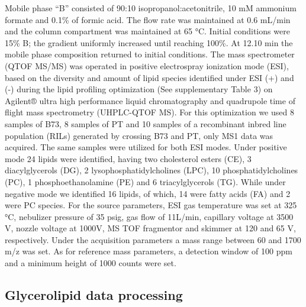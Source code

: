 \documentclass[9pt,twocolumn,twoside,lineno]{gsajnl}
\begin{document}
Mobile phase “B” consisted of 90:10 isopropanol:acetonitrile, 10 mM ammonium formate and 0.1\% of formic acid. 
The flow rate was maintained at 0.6 mL/min and the column compartment was maintained at 65 °C. Initial conditions were 15\% B; the gradient uniformly increased until reaching 100\%. 
At 12.10 min the mobile phase composition returned to initial conditions.
The mass spectrometer (QTOF MS/MS) was operated in positive electrospray ionization mode (ESI), based on the diversity and amount of lipid species identified under ESI (+) and (-) during the lipid profiling optimization (See supplementary Table 3) on Agilent® ultra high performance liquid chromatography and quadrupole time of flight mass spectrometry (UHPLC-QTOF MS). 
For this optimization we used 8 samples of B73, 8 samples of PT and 10 samples of a recombinant inbred line population (RILs) generated by crossing B73 and PT, only MS1 data was acquired. 
The same samples were utilized for both ESI modes. 
Under positive mode 24 lipids were identified, having two cholesterol esters (CE), 3 diacylglycerols (DG), 2 lysophosphatidylcholines (LPC), 10 phosphatidylcholines (PC), 1 phosphoethanolamine (PE) and 6 triacylglycerols (TG). 
While under negative mode we identified 16 lipids, of which, 14 were fatty acids (FA) and 2 were PC species. 
For the source parameters, ESI gas temperature was set at 325 °C, nebulizer pressure of 35 psig, gas flow of 11L/min, capillary voltage at 3500 V, nozzle voltage at 1000V, MS TOF fragmentor and skimmer at 120 and 65 V, respectively.
Under the acquisition parameters a mass range between 60 and 1700 m/z was set. As for reference mass parameters, a detection window of 100 ppm and a minimum height of 1000 counts were set. 

\subsection{Glycerolipid data processing}
\end{document}
